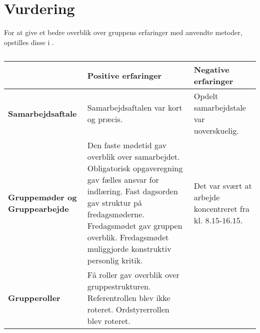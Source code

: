 \section{Vurdering}
For at give et bedre overblik over gruppens erfaringer med anvendte metoder, opstilles disse i .

\begin{table}[h]
	\caption{}
	\label{Samvur}
	\begin{tabular}{|p{3.5cm}|p{5cm}|p{5cm}|}
		
		\hline
    	&\textbf{Positive erfaringer}                               &  \textbf{Negative erfaringer}                                                               \\ \hline
		\textbf{Samarbejdsaftale}          
	   &  
		    	Samarbejdsaftalen var kort og præcis.                &  Opdelt samarbejdstale var uoverskuelig.                  \\ \hline
		\textbf{Gruppemøder og Gruppearbejde} &  
		        Den faste mødetid gav overblik over samarbejdet.                                                                                                       \newline
		     	Obligatorisk opgaveregning gav fælles ansvar for indlæring.                                            \newline
		     	Fast dagsorden gav struktur på fredagsmøderne.                                                                                           \newline
		        Fredagsmødet gav gruppen overblik.                                                                                        \newline
		        Fredagsmødet muliggjorde konstruktiv personlig kritik.
		                                                           &   Det var svært at arbejde koncentreret fra kl. $8.15$-$16.15$.                                              \\ \hline
		\textbf{Grupperoller}                         &
		       Få roller gav overblik over gruppestrukturen. \newline
		       Referentrollen blev ikke roteret.                                                                                                                       \newline
			   Ordstyrerrollen blev roteret.                                                                                                  \newline

\end{tabular}
\end{table}
